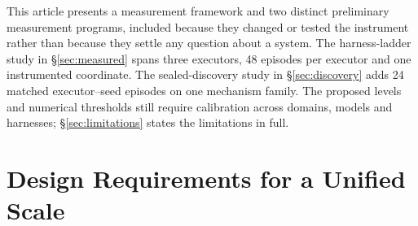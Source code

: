 \documentclass[11pt]{article}
\theoremstyle{definition}
\begin{document}
This article presents a measurement framework and two distinct preliminary measurement programs, included because they changed or tested the instrument rather than because they settle any question about a system. The harness-ladder study in \S\ref{sec:measured} spans three executors, 48 episodes per executor and one instrumented coordinate. The sealed-discovery study in \S\ref{sec:discovery} adds 24 matched executor--seed episodes on one mechanism family. The proposed levels and numerical thresholds still require calibration across domains, models and harnesses; \S\ref{sec:limitations} states the limitations in full.

\section{Design Requirements for a Unified Scale}
\end{document}
